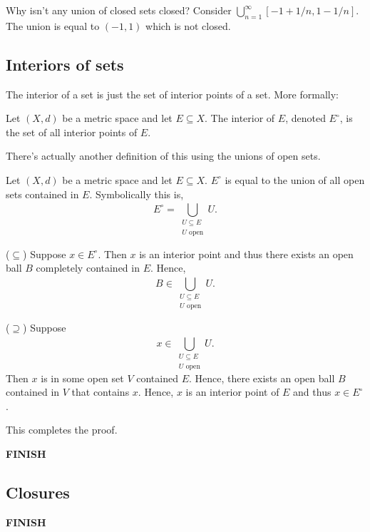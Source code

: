 \documentclass[class=article, crop=false]{standalone}
\begin{document}
Why isn't any union of closed sets closed? Consider $\bigcup_{n=1}^{\infty} [-1+1/n,1-1/n]$. The union is equal to $(-1,1)$ which is not closed.

\subsection{Interiors of sets}

The interior of a set is just the set of interior points of a set. More formally:
\begin{defn}
    Let $(X,d)$ be a metric space and let $E \subseteq X$. The interior of $E$, denoted $E^\circ$, is the set of all interior points of $E$.
\end{defn}

There's actually another definition of this using the unions of open sets.
\begin{thm}
    Let $(X,d)$ be a metric space and let $E \subseteq X$. $E^\circ$ is equal to the union of all open sets contained in $E$. Symbolically this is,
        \[
            E^\circ = \bigcup_{\substack{U \subseteq E \\ U \text{ open}}}^{} U.
        \]

\end{thm}
\begin{pf}
    ($\subseteq$) Suppose $x \in E^\circ$. Then $x$ is an interior point and thus there exists an open ball $B$ completely contained in $E$. Hence,
        \[
            B \in \bigcup_{\substack{U \subseteq E \\ U \text{ open}}}^{} U.
        \]

    ($\supseteq$) Suppose
        \[
            x \in \bigcup_{\substack{U \subseteq E \\ U \text{ open}}}^{} U.
        \]
    Then $x$ is in some open set $V$ contained $E$. Hence, there exists an open ball $B$ contained in $V$ that contains $x$. Hence, $x$ is an interior point of $E$ and thus $x \in E^\circ$.

    This completes the proof.
\end{pf}

\textbf{FINISH}


\subsection{Closures}

\textbf{FINISH}
\end{document}
